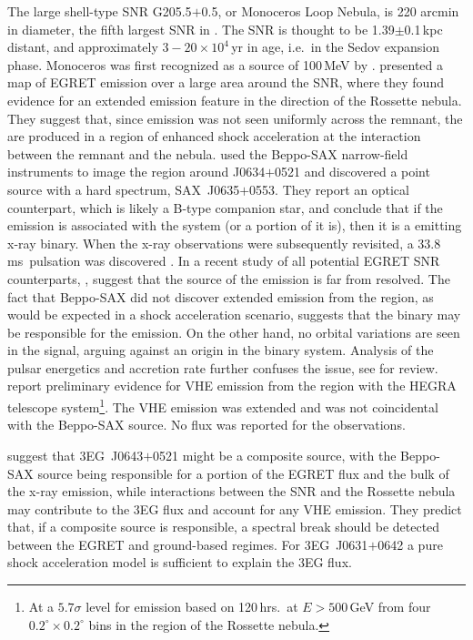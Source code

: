 The large shell-type SNR G205.5$+$0.5, or Monoceros Loop Nebula, is 220
arcmin in diameter, the fifth largest SNR in
\citet{REF::GREEN::WEB2001}. The SNR is thought to be
1.39$\pm$0.1\,kpc distant, and approximately $3-20\times 10^4$\,yr in
age, i.e.\ in the Sedov expansion phase. Monoceros was first
recognized as a source of 100\,MeV \Grays by
\citet{REF::ESPOSITO::APJ1996}. \citet{REF::JAFFE::APJ1997} presented a
map of EGRET \Gray emission over a large area around the SNR, where
they found evidence for an extended emission feature in the direction
of the Rossette nebula. They suggest that, since \Gray emission was
not seen uniformly across the remnant, the \Grays are produced in a
region of enhanced shock acceleration at the interaction between the
remnant and the nebula. \citet{REF::KAARET::APJ1999} used the
Beppo-SAX narrow-field instruments to image the region around
J0634$+$0521 and discovered a point source with a hard spectrum,
SAX~J0635$+$0553. They report an optical counterpart, which is likely
a B-type companion star, and conclude that if the \Gray emission is
associated with the system (or a portion of it is), then it is a \Gray
emitting x-ray binary.  When the x-ray observations were subsequently
revisited, a 33.8\,ms\ pulsation was discovered
\citep{REF::KAARET::APJ2000}. In a recent study of all potential EGRET
SNR counterparts,
\citet{REF::TORRES::PR2003}, suggest that the source of the \Gray
emission is far from resolved. The fact that Beppo-SAX did not
discover extended emission from the region, as would be expected in a
shock acceleration scenario, suggests that the binary may be
responsible for the \Gray emission. On the other hand, no orbital
variations are seen in the \Gray signal, arguing against an origin in
the binary system.  Analysis of the pulsar energetics and accretion
rate further confuses the issue, see \citet{REF::TORRES::PR2003} for
review. \citet{REF::LUCARELLI::HEGR2001} report preliminary evidence
for VHE \Gray emission from the region with the HEGRA telescope
system\footnote{At a $5.7\sigma$ level for emission based on
120\,hrs.\ at $E>500$\,GeV from four $0.2^\circ\times0.2^\circ$ bins
in the region of the Rossette nebula.}. The VHE emission was extended
and was not coincidental with the Beppo-SAX source. No flux was
reported for the observations.

\citet{REF::TORRES::PR2003} suggest that 3EG~J0643$+$0521 might be a
composite source, with the Beppo-SAX source being responsible for a
portion of the EGRET \Gray flux and the bulk of the x-ray emission,
while interactions between the SNR and the Rossette nebula may
contribute to the 3EG flux and account for any VHE emission. They
predict that, if a composite source is responsible, a spectral break
should be detected between the EGRET and ground-based \Gray regimes. For
3EG~J0631$+$0642 a pure shock acceleration model is sufficient to
explain the 3EG flux.

